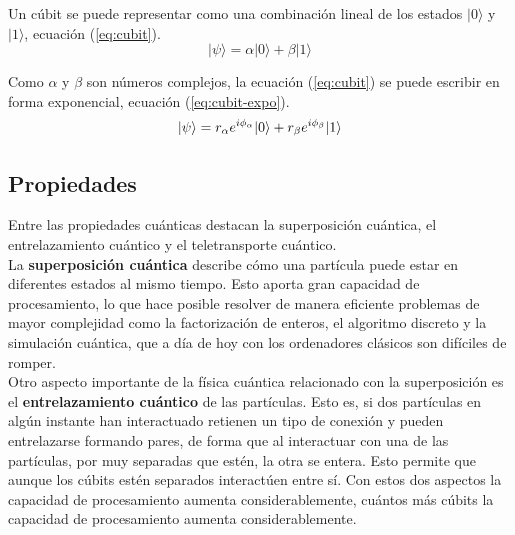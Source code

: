 \newpage
Un cúbit se puede representar como una combinación lineal de los estados $|0\rangle$ y $|1\rangle$, ecuación (\ref{eq:cubit}).\\

\begin{equation}\label{eq:cubit}
|\psi \rangle = \alpha|0\rangle + \beta |1\rangle
\end{equation}

Como $\alpha$ y $\beta$ son números complejos, la ecuación (\ref{eq:cubit}) se puede escribir en forma exponencial, ecuación (\ref{eq:cubit-expo}).\\

\begin{equation}\label{eq:cubit-expo}
|\psi\rangle = r_{\alpha} e^{i\phi_{\alpha}}|0\rangle + r_{\beta} e^{i\phi_{\beta}}|1\rangle\\
\end{equation}

\vspace{1em}
\subsection{Propiedades}
Entre las propiedades cuánticas destacan la superposición cuántica, el entrelazamiento cuántico y el teletransporte cuántico.\\

La \textbf{superposición cuántica} describe cómo una partícula puede estar en diferentes estados al mismo tiempo. Esto aporta gran capacidad de procesamiento, lo que hace posible resolver de manera eficiente problemas de mayor complejidad como la factorización de enteros, el algoritmo discreto y la simulación cuántica, que a día de hoy con los ordenadores clásicos son difíciles de romper.\\

Otro aspecto importante de la física cuántica relacionado con la superposición es el \textbf{entrelazamiento cuántico} de las partículas\cite{cumputacion-cuantica-clasica}. Esto es, si dos partículas en algún instante han interactuado retienen un tipo de conexión y pueden entrelazarse formando pares, de forma que al interactuar con una de las partículas, por muy separadas que estén, la otra se entera. Esto permite que aunque los cúbits estén separados interactúen entre sí. Con estos dos aspectos la capacidad de procesamiento aumenta considerablemente, cuántos más cúbits la capacidad de procesamiento aumenta considerablemente.\\

